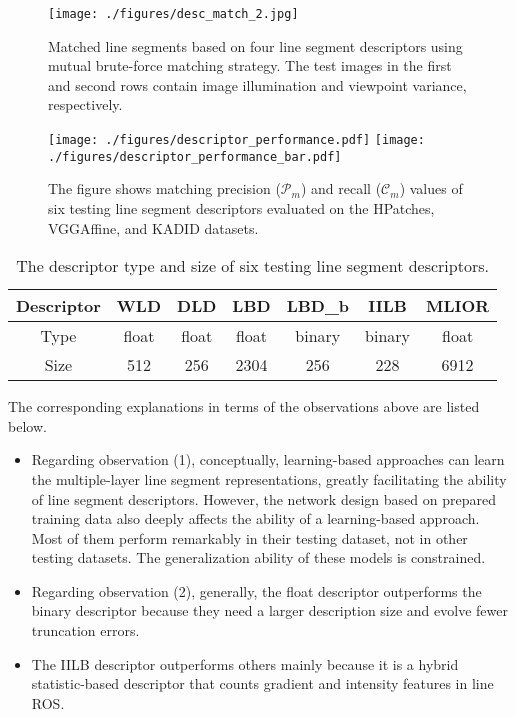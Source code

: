 \documentclass[journal,compsoc]{IEEEtran}
\begin{document}
\begin{figure*}[tbp]
	\centering
	\texttt{[image: ./figures/desc\_match\_2.jpg]}
	\caption{Matched line segments based on four line segment descriptors using mutual brute-force matching strategy. The test images in the first and second rows contain image illumination and viewpoint variance, respectively.}
	\label{description_visualization}
\end{figure*}

\begin{figure}[tbp]
	\centering
	\texttt{[image: ./figures/descriptor\_performance.pdf]}
	\texttt{[image: ./figures/descriptor\_performance\_bar.pdf]}
	\caption{The figure shows matching precision ($\mathcal{P}_m$) and recall ($\mathcal{C}_m$) values of six testing line segment descriptors evaluated on the HPatches, VGGAffine, and KADID datasets.}
	\label{descriptor_performance}
\end{figure}

\begin{table}[tbp] 	
	\centering 	
	\setlength\tabcolsep{1pt}	 	
	\scriptsize 	
	\caption{The descriptor type and size of six testing line segment descriptors.} 	\begin{tabular}{|c|c|c|c|c|c|c|} 		
		\hline 		Descriptor & WLD \cite{WLD}   & DLD \cite{DLD}   & LBD \cite{LBD}  & LBD\_b \cite{LBD} & IILB \cite{IILB} & MLIOR \cite{ALineMatchingMethodBasedonMultipleIntensityOrderingwithUniformlySpacedSampling} \\ \hline 		Type & float & float & float & binary & binary & float \\ \hline 		Size & 512   & 256   & 2304  & 256    & 228 & 6912  \\ \hline 	
	\end{tabular}%
	\label{descriptor_type_size} 
\end{table}

The corresponding explanations in terms of the observations above are listed below.
\begin{itemize}
\item Regarding observation (1), conceptually, learning-based approaches can learn the multiple-layer line segment representations, greatly facilitating the ability of line segment descriptors. However, the network design based on prepared training data also deeply affects the ability of a learning-based approach. Most of them perform remarkably in their testing dataset, not in other testing datasets. The generalization ability of these models is constrained.

\item Regarding observation (2), generally, the float descriptor outperforms the binary descriptor because they need a larger description size and evolve fewer truncation errors.

\item The IILB descriptor outperforms others mainly because it is a hybrid statistic-based descriptor that counts gradient and intensity features in line ROS.
\end{itemize}
\end{document}
